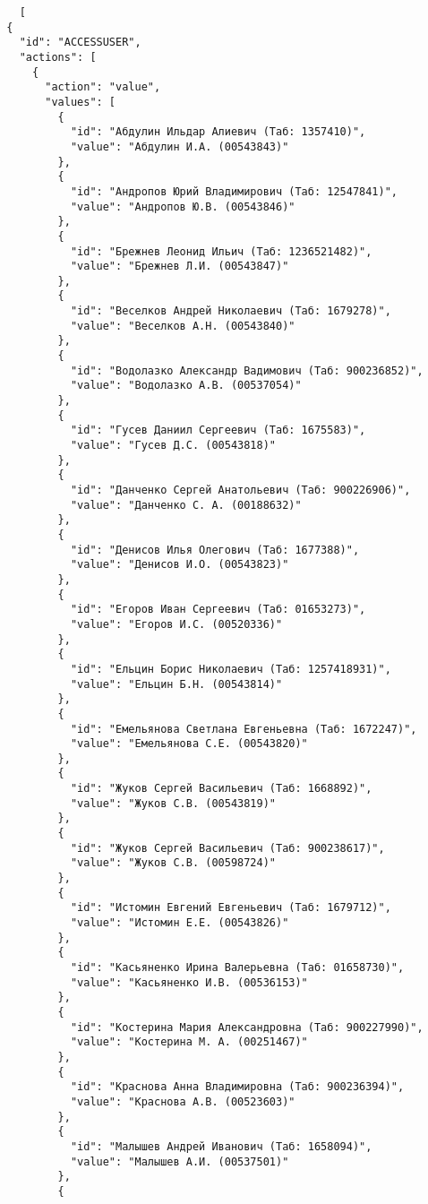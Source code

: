 \begin{verbatim}
    [
  {
    "id": "ACCESSUSER",
    "actions": [
      {
        "action": "value",
        "values": [
          {
            "id": "Абдулин Ильдар Алиевич (Таб: 1357410)",
            "value": "Абдулин И.А. (00543843)"
          },
          {
            "id": "Андропов Юрий Владимирович (Таб: 12547841)",
            "value": "Андропов Ю.В. (00543846)"
          },
          {
            "id": "Брежнев Леонид Ильич (Таб: 1236521482)",
            "value": "Брежнев Л.И. (00543847)"
          },
          {
            "id": "Веселков Андрей Николаевич (Таб: 1679278)",
            "value": "Веселков А.Н. (00543840)"
          },
          {
            "id": "Водолазко Александр Вадимович (Таб: 900236852)",
            "value": "Водолазко А.В. (00537054)"
          },
          {
            "id": "Гусев Даниил Сергеевич (Таб: 1675583)",
            "value": "Гусев Д.С. (00543818)"
          },
          {
            "id": "Данченко Сергей Анатольевич (Таб: 900226906)",
            "value": "Данченко С. А. (00188632)"
          },
          {
            "id": "Денисов Илья Олегович (Таб: 1677388)",
            "value": "Денисов И.О. (00543823)"
          },
          {
            "id": "Егоров Иван Сергеевич (Таб: 01653273)",
            "value": "Егоров И.С. (00520336)"
          },
          {
            "id": "Ельцин Борис Николаевич (Таб: 1257418931)",
            "value": "Ельцин Б.Н. (00543814)"
          },
          {
            "id": "Емельянова Светлана Евгеньевна (Таб: 1672247)",
            "value": "Емельянова С.Е. (00543820)"
          },
          {
            "id": "Жуков Сергей Васильевич (Таб: 1668892)",
            "value": "Жуков С.В. (00543819)"
          },
          {
            "id": "Жуков Сергей Васильевич (Таб: 900238617)",
            "value": "Жуков С.В. (00598724)"
          },
          {
            "id": "Истомин Евгений Евгеньевич (Таб: 1679712)",
            "value": "Истомин Е.Е. (00543826)"
          },
          {
            "id": "Касьяненко Ирина Валерьевна (Таб: 01658730)",
            "value": "Касьяненко И.В. (00536153)"
          },
          {
            "id": "Костерина Мария Александровна (Таб: 900227990)",
            "value": "Костерина М. А. (00251467)"
          },
          {
            "id": "Краснова Анна Владимировна (Таб: 900236394)",
            "value": "Краснова А.В. (00523603)"
          },
          {
            "id": "Малышев Андрей Иванович (Таб: 1658094)",
            "value": "Малышев А.И. (00537501)"
          },
          {

\end{verbatim}

